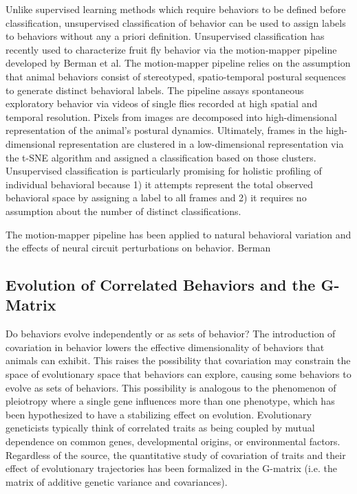 \documentclass[12pt,letterpaper]{article}
\begin{document}
Unlike supervised learning methods which require behaviors to be defined before classification, unsupervised classification of behavior can be used to assign labels to behaviors without any a priori definition. Unsupervised classification has recently used to characterize fruit fly behavior via the motion-mapper pipeline developed by Berman et al. The motion-mapper pipeline relies on the assumption that animal behaviors consist of stereotyped, spatio-temporal postural sequences to generate distinct behavioral labels. The pipeline assays spontaneous exploratory behavior via videos of single flies recorded at high spatial and temporal resolution. Pixels from images are decomposed into high-dimensional representation of the animal's postural dynamics. Ultimately, frames in the high-dimensional representation are clustered in a low-dimensional representation via the t-SNE algorithm and assigned a classification based on those clusters. Unsupervised classification is particularly promising for holistic profiling of individual behavioral because 1) it attempts represent the total observed behavioral space by assigning a label to all frames and 2) it requires no assumption about the number of distinct classifications.

The motion-mapper pipeline has been applied to natural behavioral variation and the effects of neural circuit perturbations on behavior. Berman


\subsection{Evolution of Correlated Behaviors and the G-Matrix}

Do behaviors evolve independently or as sets of behavior? 
The introduction of covariation in behavior lowers the effective dimensionality of behaviors that animals can exhibit. This raises the possibility that covariation may constrain the space of evolutionary space that behaviors can explore, causing some behaviors to evolve as sets of behaviors. This possibility is analogous to the phenomenon of pleiotropy where a single gene influences more than one phenotype, which has been hypothesized to have a stabilizing effect on evolution. Evolutionary geneticists typically think of correlated traits as being coupled by mutual dependence on common genes, developmental origins, or environmental factors. Regardless of the source, the quantitative study of covariation of traits and their effect of evolutionary trajectories has been formalized in the G-matrix (i.e. the matrix of additive genetic variance and covariances). 
\end{document}
